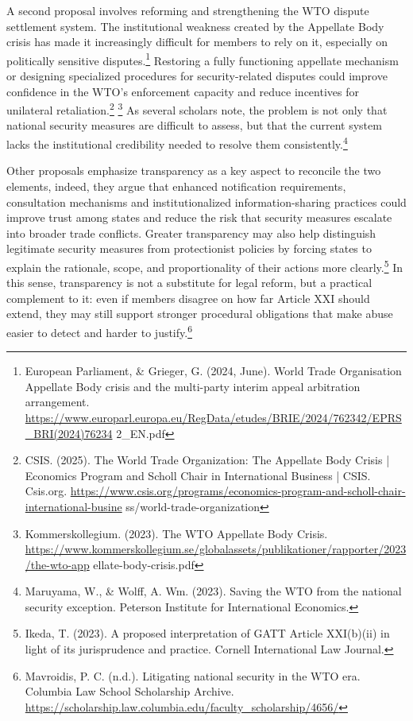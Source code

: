 A second proposal involves reforming and strengthening the WTO dispute settlement system. The institutional weakness created by the Appellate Body crisis has made it increasingly difficult for members to rely on it, especially on politically sensitive disputes.\footnote{European Parliament, \& Grieger, G. (2024, June). World Trade Organisation Appellate Body crisis and the multi-party interim appeal arbitration arrangement. \url{https://www.europarl.europa.eu/RegData/etudes/BRIE/2024/762342/EPRS_BRI(2024)76234} 2\_EN.pdf} Restoring a fully functioning appellate mechanism or designing specialized procedures for security-related disputes could improve confidence in the WTO’s enforcement capacity and reduce incentives for unilateral retaliation.\footnote{CSIS. (2025). The World Trade Organization: The Appellate Body Crisis | Economics Program and Scholl Chair in International Business | CSIS. Csis.org. \url{https://www.csis.org/programs/economics-program-and-scholl-chair-international-busine} ss/world-trade-organization} \footnote{Kommerskollegium. (2023). The WTO Appellate Body Crisis. \url{https://www.kommerskollegium.se/globalassets/publikationer/rapporter/2023/the-wto-app} ellate-body-crisis.pdf} As several scholars note, the problem is not only that national security measures are difficult to assess, but that the current system lacks the institutional credibility needed to resolve them consistently.\footnote{Maruyama, W., \& Wolff, A. Wm. (2023). Saving the WTO from the national security exception. Peterson Institute for International Economics.}

Other proposals emphasize transparency as a key aspect to reconcile the two elements, indeed, they argue that enhanced notification requirements, consultation mechanisms and institutionalized information-sharing practices could improve trust among states and reduce the risk that security measures escalate into broader trade conflicts. Greater transparency may also help distinguish legitimate security measures from protectionist policies by forcing states to explain the rationale, scope, and proportionality of their actions more clearly.\footnote{Ikeda, T. (2023). A proposed interpretation of GATT Article XXI(b)(ii) in light of its jurisprudence and practice. Cornell International Law Journal.} In this sense, transparency is not a substitute for legal reform, but a practical complement to it: even if members disagree on how far Article XXI should extend, they may still support stronger procedural obligations that make abuse easier to detect and harder to justify.\footnote{Mavroidis, P. C. (n.d.). Litigating national security in the WTO era. Columbia Law School Scholarship Archive. \url{https://scholarship.law.columbia.edu/faculty_scholarship/4656/}}
